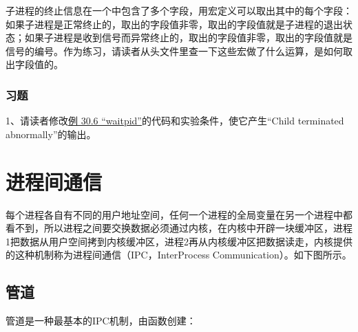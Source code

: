 


子进程的终止信息在一个中包含了多个字段，用宏定义可以取出其中的每个字段：如果子进程是正常终止的，取出的字段值非零，取出的字段值就是子进程的退出状态；如果子进程是收到信号而异常终止的，取出的字段值非零，取出的字段值就是信号的编号。作为练习，请读者从头文件里查一下这些宏做了什么运算，是如何取出字段值的。


\subsubsection*{习题}
%


1、请读者修改\hyperlink{db.ch30s03.process.waitpid}{例 30.\BookSplit{}6 “waitpid”}的代码和实验条件，使它产生“Child terminated abnormally”的输出。




\section{进程间通信}
%
每个进程各自有不同的用户地址空间，任何一个进程的全局变量在另一个进程中都看不到，所以进程之间要交换数据必须通过内核，在内核中开辟一块缓冲区，进程1把数据从用户空间拷到内核缓冲区，进程2再从内核缓冲区把数据读走，内核提供的这种机制称为进程间通信（IPC，InterProcess Communication）。如下图所示。



\subsection{管道}
%


管道是一种最基本的IPC机制，由函数创建：




